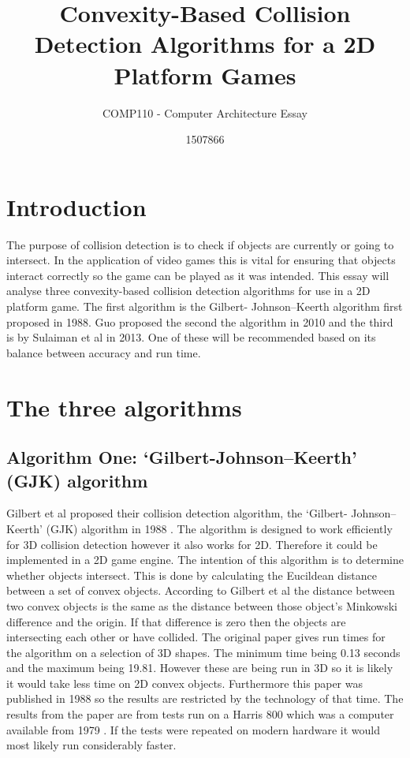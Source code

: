 \documentclass{scrartcl}
\title{Convexity-Based Collision Detection Algorithms for a 2D Platform Games}
\subtitle{COMP110 - Computer Architecture Essay}
\author{1507866}
\begin{document}
	
\maketitle
	
	
\section{Introduction}
	
The purpose of collision detection is to check if objects are currently or going to intersect. In the application of video games this is vital for ensuring that objects interact correctly so the game can be played as it was intended.  This essay will analyse three convexity-based collision detection algorithms for use in a 2D platform game.  The first algorithm is the Gilbert- Johnson–Keerth algorithm first proposed in 1988. Guo proposed the second the algorithm in 2010 and the third is by Sulaiman et al in 2013. One of these will be recommended based on its balance between accuracy and run time.

	
\section{The three algorithms}
\subsection{Algorithm One: ‘Gilbert-Johnson–Keerth’ (GJK) algorithm}
Gilbert et al proposed their collision detection algorithm, the ‘Gilbert- Johnson– Keerth’ (GJK) algorithm in 1988 \cite{GJK}. The algorithm is designed to work efficiently for 3D collision detection however it also works for 2D. Therefore it could be implemented in a 2D game engine. The intention of this algorithm is to determine whether objects intersect. This is done by calculating the Eucildean distance between a set of convex objects. According to Gilbert et al the distance between two convex objects is the same as the distance between those object’s Minkowski difference and the origin. If that difference is zero then the objects are intersecting each other or have collided.
\newline 
The original paper gives run times for the algorithm on a selection of 3D shapes. The minimum time being 0.13 seconds and the maximum being 19.81. However these are being run in 3D so it is likely it would take less time on 2D convex objects. Furthermore this paper was published in 1988 so the results are restricted by the technology of that time. The results from the paper are from tests run on a Harris 800 which was a computer available from 1979 \cite{harris800}. If the tests were repeated on modern hardware it would most likely run considerably faster.
\end{document}
